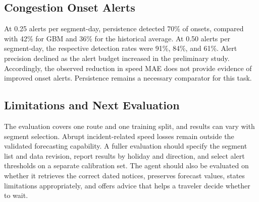 \subsection{Congestion Onset Alerts}
At 0.25 alerts per segment-day, persistence detected 70\% of onsets, compared with 42\% for GBM and 36\% for the historical average. At 0.50 alerts per segment-day, the respective detection rates were 91\%, 84\%, and 61\%. Alert precision declined as the alert budget increased in the preliminary study. Accordingly, the observed reduction in speed MAE does not provide evidence of improved onset alerts. Persistence remains a necessary comparator for this task.

\subsection{Limitations and Next Evaluation}
The evaluation covers one route and one training split, and results can vary with segment selection. Abrupt incident-related speed losses remain outside the validated forecasting capability. A fuller evaluation should specify the segment list and data revision, report results by holiday and direction, and select alert thresholds on a separate calibration set. The agent should also be evaluated on whether it retrieves the correct dated notices, preserves forecast values, states limitations appropriately, and offers advice that helps a traveler decide whether to wait.

